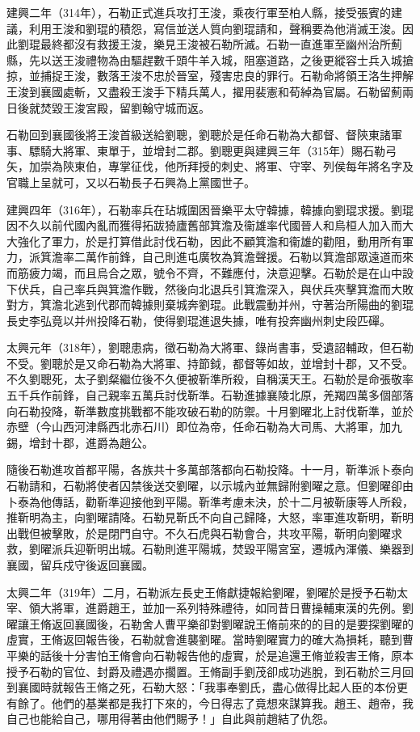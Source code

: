 建興二年（314年），石勒正式進兵攻打王浚，乘夜行軍至柏人縣，接受張賓的建議，利用王浚和劉琨的積怨，寫信並送人質向劉琨請和，聲稱要為他消滅王浚。因此劉琨最終都沒有救援王浚，樂見王浚被石勒所滅。石勒一直進軍至幽州治所薊縣，先以送王浚禮物為由驅趕數千頭牛羊入城，阻塞道路，之後更縱容士兵入城搶掠，並捕捉王浚，數落王浚不忠於晉室，殘害忠良的罪行。石勒命將領王洛生押解王浚到襄國處斬，又盡殺王浚手下精兵萬人，擢用裴憲和荀綽為官屬。石勒留薊兩日後就焚毀王浚宮殿，留劉翰守城而返。

石勒回到襄國後將王浚首級送給劉聰，劉聰於是任命石勒為大都督、督陝東諸軍事、驃騎大將軍、東單于，並增封二郡。劉聰更與建興三年（315年）賜石勒弓矢，加崇為陝東伯，專掌征伐，他所拜授的刺史、將軍、守宰、列侯每年將名字及官職上呈就可，又以石勒長子石興為上黨國世子。

建興四年（316年），石勒率兵在玷城圍困晉樂平太守韓據，韓據向劉琨求援。劉琨因不久以前代國內亂而獲得拓跋猗廬舊部箕澹及衞雄率代國晉人和烏桓人加入而大大強化了軍力，於是打算借此討伐石勒，因此不顧箕澹和衞雄的勸阻，動用所有軍力，派箕澹率二萬作前鋒，自己則進屯廣牧為箕澹聲援。石勒以箕澹部眾遠道而來而筋疲力竭，而且烏合之眾，號令不齊，不難應付，決意迎擊。石勒於是在山中設下伏兵，自己率兵與箕澹作戰，然後向北退兵引箕澹深入，與伏兵夾擊箕澹而大敗對方，箕澹北逃到代郡而韓據則棄城奔劉琨。此戰震動并州，守著治所陽曲的劉琨長史李弘竟以并州投降石勒，使得劉琨進退失據，唯有投奔幽州刺史段匹磾。

太興元年（318年），劉聰患病，徵石勒為大將軍、錄尚書事，受遺詔輔政，但石勒不受。劉聰於是又命石勒為大將軍、持節鉞，都督等如故，並增封十郡，又不受。不久劉聰死，太子劉粲繼位後不久便被靳準所殺，自稱漢天王。石勒於是命張敬率五千兵作前鋒，自己親率五萬兵討伐靳準。石勒進據襄陵北原，羌羯四萬多個部落向石勒投降，靳準數度挑戰都不能攻破石勒的防禦。十月劉曜北上討伐靳準，並於赤壁（今山西河津縣西北赤石川）即位為帝，任命石勒為大司馬、大將軍，加九錫，增封十郡，進爵為趙公。

隨後石勒進攻首都平陽，各族共十多萬部落都向石勒投降。十一月，靳準派卜泰向石勒請和，石勒將使者囚禁後送交劉曜，以示城內並無歸附劉曜之意。但劉曜卻由卜泰為他傳話，勸靳準迎接他到平陽。靳準考慮未決，於十二月被靳康等人所殺，推靳明為主，向劉曜請降。石勒見靳氏不向自己歸降，大怒，率軍進攻靳明，靳明出戰但被擊敗，於是閉門自守。不久石虎與石勒會合，共攻平陽，靳明向劉曜求救，劉曜派兵迎靳明出城。石勒則進平陽城，焚毀平陽宮室，遷城內渾儀、樂器到襄國，留兵戍守後返回襄國。

太興二年（319年）二月，石勒派左長史王脩獻捷報給劉曜，劉曜於是授予石勒太宰、領大將軍，進爵趙王，並加一系列特殊禮待，如同昔日曹操輔東漢的先例。劉曜讓王脩返回襄國後，石勒舍人曹平樂卻對劉曜說王脩前來的的目的是要探劉曜的虛實，王脩返回報告後，石勒就會進襲劉曜。當時劉曜實力的確大為損耗，聽到曹平樂的話後十分害怕王脩會向石勒報告他的虛實，於是追還王脩並殺害王脩，原本授予石勒的官位、封爵及禮遇亦擱置。王脩副手劉茂卻成功逃脫，到石勒於三月回到襄國時就報告王脩之死，石勒大怒：「我事奉劉氏，盡心做得比起人臣的本份更有餘了。他們的基業都是我打下來的，今日得志了竟想來謀算我。趙王、趙帝，我自己也能給自己，哪用得著由他們賜予！」自此與前趙結了仇怨。

